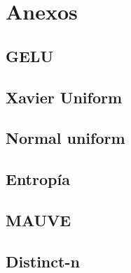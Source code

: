 \documentclass[11pt]{book}
\newcommand{\clearemptydoublepage}{\newpage{\pagestyle{empty}\cleardoublepage}}
\theoremstyle{plain}
\theoremstyle{definition}
\begin{document}
\clearemptydoublepage

\printbibliography[title={Referencias Bibliográficas}]

\appendix 
\chapter{Anexos}

\section{GELU} \label{sec:gelu}
\section{Xavier Uniform} \label{sec:xavier}
\section{Normal uniform} \label{sec:normal}

\section{Entropía} \label{sec:entropia}

\section{MAUVE} \label{sec:mauve}


\section{Distinct-n} \label{sec:distinct-n}


\clearemptydoublepage
\end{document}
